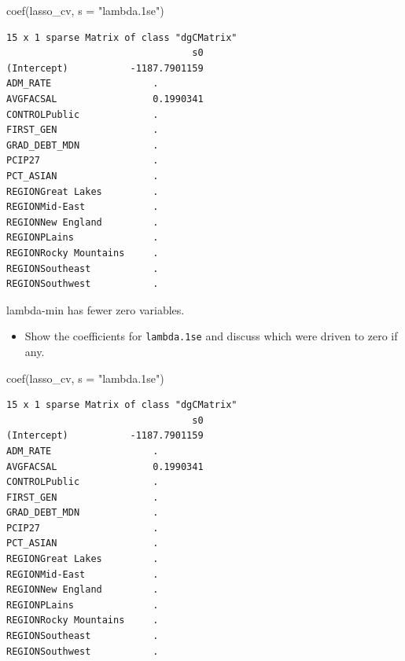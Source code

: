 \documentclass[
  letterpaper,
  DIV=11,
  numbers=noendperiod]{scrartcl}
\newenvironment{Shaded}{\begin{snugshade}}{\end{snugshade}}
\newcommand{\AttributeTok}[1]{\textcolor[rgb]{0.40,0.45,0.13}{#1}}
\newcommand{\FunctionTok}[1]{\textcolor[rgb]{0.28,0.35,0.67}{#1}}
\newcommand{\NormalTok}[1]{\textcolor[rgb]{0.00,0.23,0.31}{#1}}
\newcommand{\StringTok}[1]{\textcolor[rgb]{0.13,0.47,0.30}{#1}}
\providecommand{\tightlist}{%
  \setlength{\itemsep}{0pt}\setlength{\parskip}{0pt}}\usepackage{longtable,booktabs,array}
\begin{document}
\begin{Shaded}
\begin{Highlighting}[]
\FunctionTok{coef}\NormalTok{(lasso\_cv, }\AttributeTok{s =} \StringTok{"lambda.1se"}\NormalTok{)}
\end{Highlighting}
\end{Shaded}

\begin{verbatim}
15 x 1 sparse Matrix of class "dgCMatrix"
                                 s0
(Intercept)           -1187.7901159
ADM_RATE                  .        
AVGFACSAL                 0.1990341
CONTROLPublic             .        
FIRST_GEN                 .        
GRAD_DEBT_MDN             .        
PCIP27                    .        
PCT_ASIAN                 .        
REGIONGreat Lakes         .        
REGIONMid-East            .        
REGIONNew England         .        
REGIONPLains              .        
REGIONRocky Mountains     .        
REGIONSoutheast           .        
REGIONSouthwest           .        
\end{verbatim}

lambda-min has fewer zero variables.

\begin{itemize}
\tightlist
\item
  Show the coefficients for \texttt{lambda.1se} and discuss which were
  driven to zero if any.
\end{itemize}

\begin{Shaded}
\begin{Highlighting}[]
\FunctionTok{coef}\NormalTok{(lasso\_cv, }\AttributeTok{s =} \StringTok{"lambda.1se"}\NormalTok{)}
\end{Highlighting}
\end{Shaded}

\begin{verbatim}
15 x 1 sparse Matrix of class "dgCMatrix"
                                 s0
(Intercept)           -1187.7901159
ADM_RATE                  .        
AVGFACSAL                 0.1990341
CONTROLPublic             .        
FIRST_GEN                 .        
GRAD_DEBT_MDN             .        
PCIP27                    .        
PCT_ASIAN                 .        
REGIONGreat Lakes         .        
REGIONMid-East            .        
REGIONNew England         .        
REGIONPLains              .        
REGIONRocky Mountains     .        
REGIONSoutheast           .        
REGIONSouthwest           .        
\end{verbatim}
\end{document}
